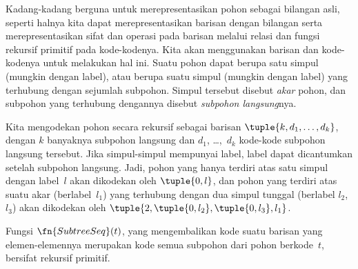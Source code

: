 \documentclass[../../../include/open-logic-section]{subfiles}
\begin{document}

Kadang-kadang berguna untuk merepresentasikan pohon sebagai bilangan asli,
seperti halnya kita dapat merepresentasikan barisan dengan bilangan serta
merepresentasikan sifat dan operasi pada barisan melalui relasi dan fungsi
rekursif primitif pada kode-kodenya. Kita akan menggunakan barisan dan
kode-kodenya untuk melakukan hal ini. Suatu pohon dapat berupa satu simpul
(mungkin dengan label), atau berupa suatu simpul (mungkin dengan label) yang
terhubung dengan sejumlah subpohon. Simpul tersebut disebut \emph{akar} pohon,
dan subpohon yang terhubung dengannya disebut \emph{subpohon langsung}nya.

Kita mengodekan pohon secara rekursif sebagai barisan
$\tuple{k,d_1,\dots,d_k}$, dengan $k$ banyaknya subpohon langsung dan
$d_1$, \dots,~$d_k$ kode-kode subpohon langsung tersebut. Jika simpul-simpul
mempunyai label, label dapat dicantumkan setelah subpohon langsung. Jadi,
pohon yang hanya terdiri atas satu simpul dengan label~$l$ akan dikodekan oleh
$\tuple{0,l}$, dan pohon yang terdiri atas suatu akar (berlabel~$l_1$) yang
terhubung dengan dua simpul tunggal (berlabel $l_2$, $l_3$) akan dikodekan
oleh $\tuple{2,\tuple{0,l_2},\tuple{0,l_3},l_1}$.

\begin{prop}
  Fungsi $\fn{SubtreeSeq}(t)$, yang mengembalikan kode suatu barisan yang
  elemen-elemennya merupakan kode semua subpohon dari pohon berkode~$t$,
  bersifat rekursif primitif.
\end{prop}
\end{document}
